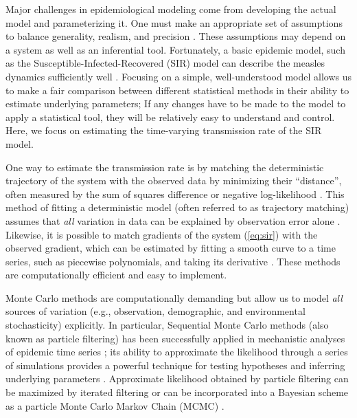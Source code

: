 \documentclass{article}
\newcommand{\eref}[1]{(\ref{eq:#1})}
\begin{document}
Major challenges in epidemiological modeling come from developing the actual model and parameterizing it.
One must make an appropriate set of assumptions to balance generality, realism, and precision \citep{levins1966strategy}.
These assumptions may depend on a system as well as an inferential tool.
Fortunately, a basic epidemic model, such as the Susceptible-Infected-Recovered (SIR) model can describe the measles dynamics sufficiently well \citep{earn2000simple, krylova2013effects, hempel2015century, dalziel2016persistent}.
Focusing on a simple, well-understood model allows us to make a fair comparison between different statistical methods in their ability to estimate underlying parameters;
If any changes have to be made to the model to apply a statistical tool, they will be relatively easy to understand and control.
Here, we focus on estimating the time-varying transmission rate of the SIR model.

One way to estimate the transmission rate is by matching the deterministic trajectory of the system with the observed data by minimizing their ``distance'', often measured by the sum of squares difference or negative log-likelihood \citep{riley2003transmission, chowell2004basic}.
This method of fitting a deterministic model (often referred to as trajectory matching) assumes that \emph{all} variation in data can be explained by observation error alone \citep{bolker2008ecological}.
Likewise, it is possible to match gradients of the system \eref{sir} with the observed gradient, which can be estimated by fitting a smooth curve to a time series, such as piecewise polynomials, and taking its derivative \citep{ellner2002fitting}.
These methods are computationally efficient and easy to implement.

Monte Carlo methods are computationally demanding but allow us to model \emph{all} sources of variation (e.g., observation, demographic, and environmental stochasticity) explicitly.
In particular, Sequential Monte Carlo methods (also known as particle filtering) has been successfully applied in mechanistic analyses of epidemic time series \citep{he2009plug, he2011mechanistic, didelot2017model}; its ability to approximate the likelihood through a series of simulations provides a powerful technique for testing hypotheses and inferring underlying parameters \citep{ionides2006inference, breto2009time, king2015statistical}.
Approximate likelihood obtained by particle filtering can be maximized by iterated filtering \citep{ionides2011iterated, ionides2015inference} or can be incorporated into a Bayesian scheme as a particle Monte Carlo Markov Chain (MCMC) \citep{andrieu2010particle}.
\end{document}
